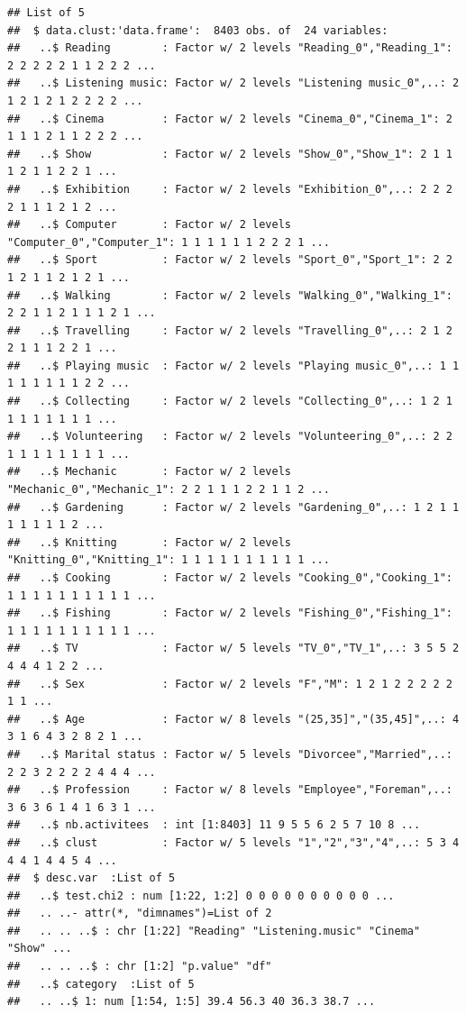 \documentclass[]{book}
\begin{document}
\begin{verbatim}
## List of 5
##  $ data.clust:'data.frame':  8403 obs. of  24 variables:
##   ..$ Reading        : Factor w/ 2 levels "Reading_0","Reading_1": 2 2 2 2 2 1 1 2 2 2 ...
##   ..$ Listening music: Factor w/ 2 levels "Listening music_0",..: 2 1 2 1 2 1 2 2 2 2 ...
##   ..$ Cinema         : Factor w/ 2 levels "Cinema_0","Cinema_1": 2 1 1 1 2 1 1 2 2 2 ...
##   ..$ Show           : Factor w/ 2 levels "Show_0","Show_1": 2 1 1 1 2 1 1 2 2 1 ...
##   ..$ Exhibition     : Factor w/ 2 levels "Exhibition_0",..: 2 2 2 2 1 1 1 2 1 2 ...
##   ..$ Computer       : Factor w/ 2 levels "Computer_0","Computer_1": 1 1 1 1 1 1 2 2 2 1 ...
##   ..$ Sport          : Factor w/ 2 levels "Sport_0","Sport_1": 2 2 1 2 1 1 2 1 2 1 ...
##   ..$ Walking        : Factor w/ 2 levels "Walking_0","Walking_1": 2 2 1 1 2 1 1 1 2 1 ...
##   ..$ Travelling     : Factor w/ 2 levels "Travelling_0",..: 2 1 2 2 1 1 1 2 2 1 ...
##   ..$ Playing music  : Factor w/ 2 levels "Playing music_0",..: 1 1 1 1 1 1 1 1 2 2 ...
##   ..$ Collecting     : Factor w/ 2 levels "Collecting_0",..: 1 2 1 1 1 1 1 1 1 1 ...
##   ..$ Volunteering   : Factor w/ 2 levels "Volunteering_0",..: 2 2 1 1 1 1 1 1 1 1 ...
##   ..$ Mechanic       : Factor w/ 2 levels "Mechanic_0","Mechanic_1": 2 2 1 1 1 2 2 1 1 2 ...
##   ..$ Gardening      : Factor w/ 2 levels "Gardening_0",..: 1 2 1 1 1 1 1 1 1 2 ...
##   ..$ Knitting       : Factor w/ 2 levels "Knitting_0","Knitting_1": 1 1 1 1 1 1 1 1 1 1 ...
##   ..$ Cooking        : Factor w/ 2 levels "Cooking_0","Cooking_1": 1 1 1 1 1 1 1 1 1 1 ...
##   ..$ Fishing        : Factor w/ 2 levels "Fishing_0","Fishing_1": 1 1 1 1 1 1 1 1 1 1 ...
##   ..$ TV             : Factor w/ 5 levels "TV_0","TV_1",..: 3 5 5 2 4 4 4 1 2 2 ...
##   ..$ Sex            : Factor w/ 2 levels "F","M": 1 2 1 2 2 2 2 2 1 1 ...
##   ..$ Age            : Factor w/ 8 levels "(25,35]","(35,45]",..: 4 3 1 6 4 3 2 8 2 1 ...
##   ..$ Marital status : Factor w/ 5 levels "Divorcee","Married",..: 2 2 3 2 2 2 2 4 4 4 ...
##   ..$ Profession     : Factor w/ 8 levels "Employee","Foreman",..: 3 6 3 6 1 4 1 6 3 1 ...
##   ..$ nb.activitees  : int [1:8403] 11 9 5 5 6 2 5 7 10 8 ...
##   ..$ clust          : Factor w/ 5 levels "1","2","3","4",..: 5 3 4 4 4 1 4 4 5 4 ...
##  $ desc.var  :List of 5
##   ..$ test.chi2 : num [1:22, 1:2] 0 0 0 0 0 0 0 0 0 0 ...
##   .. ..- attr(*, "dimnames")=List of 2
##   .. .. ..$ : chr [1:22] "Reading" "Listening.music" "Cinema" "Show" ...
##   .. .. ..$ : chr [1:2] "p.value" "df"
##   ..$ category  :List of 5
##   .. ..$ 1: num [1:54, 1:5] 39.4 56.3 40 36.3 38.7 ...

\end{verbatim}
\end{document}

